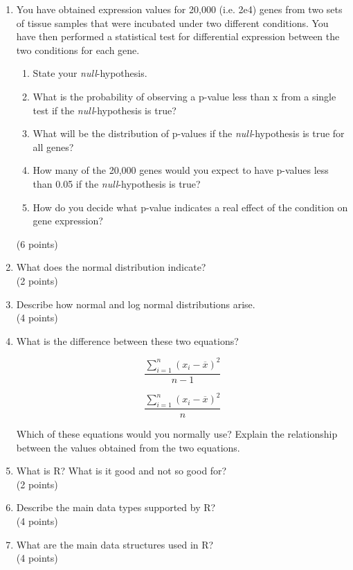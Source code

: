 \documentclass[11pt]{article}
\begin{document}
\begin{enumerate}
\item You have obtained expression values for 20,000 (i.e. 2e4) genes from two sets of tissue samples
  that were incubated under two different conditions. You have then performed
  a statistical test for differential expression between the two conditions
  for each gene.
  \begin{enumerate}
  \item State your \textit{null}-hypothesis.
  \item What is the probability of observing a p-value less than
    x from a single test if the \textit{null}-hypothesis is true?
  \item What will be the distribution of p-values if the
    \textit{null}-hypothesis is true for all genes?
  \item How many of the 20,000 genes would you expect to have p-values
    less than 0.05 if the \textit{null}-hypothesis is true?
  \item How do you decide what p-value indicates a real effect of
    the condition on gene expression?
  \end{enumerate}
(6 points)

  
\item What does the normal distribution indicate?\\
  (2 points)

\item Describe how normal and log normal distributions arise.\\
  (4 points)
  
\item What is the difference between these two equations?

  \begin{minipage}{0.5\textwidth}
    $$ 
    \frac{\sum_{i=1}^{n}{(x_i - \overline{x})^2}}{n-1} 
    $$
  \end{minipage}%
  \begin{minipage}{0.5\textwidth}
    $$
    \frac{\sum_{i=1}^{n}{(x_i - \overline{x})^2}}{n} 
    $$
  \end{minipage}

  Which of these equations would you normally use? Explain the
  relationship between the values obtained from the two equations.

\item What is R? What is it good and not so good for?\\
  (2 points)
\item Describe the main data types supported by R?\\
  (4 points)
\item What are the main data structures used in R?\\
  (4 points)


\end{enumerate}
\end{document}
